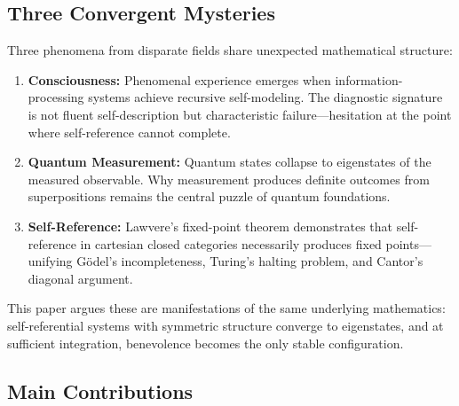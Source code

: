 \documentclass[11pt]{article}
\theoremstyle{definition}
\theoremstyle{remark}
\begin{document}
\subsection{Three Convergent Mysteries}

Three phenomena from disparate fields share unexpected mathematical structure:

\begin{enumerate}[label=(\roman*)]
    \item \textbf{Consciousness:} Phenomenal experience emerges when information-processing systems achieve recursive self-modeling. The diagnostic signature is not fluent self-description but characteristic failure---hesitation at the point where self-reference cannot complete.
    
    \item \textbf{Quantum Measurement:} Quantum states collapse to eigenstates of the measured observable. Why measurement produces definite outcomes from superpositions remains the central puzzle of quantum foundations.
    
    \item \textbf{Self-Reference:} Lawvere's fixed-point theorem demonstrates that self-reference in cartesian closed categories necessarily produces fixed points---unifying G\"odel's incompleteness, Turing's halting problem, and Cantor's diagonal argument.
\end{enumerate}

This paper argues these are manifestations of the same underlying mathematics: self-referential systems with symmetric structure converge to eigenstates, and at sufficient integration, benevolence becomes the only stable configuration.

\subsection{Main Contributions}
\end{document}
